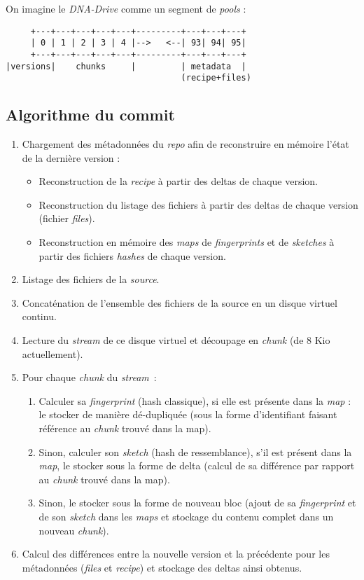 \documentclass[a4paper]{article}
\begin{document}
On imagine le \emph{DNA-Drive} comme un segment de \emph{pools} :

\begin{verbatim}
     +---+---+---+---+---+---------+---+---+---+
     | 0 | 1 | 2 | 3 | 4 |-->   <--| 93| 94| 95|
     +---+---+---+---+---+---------+---+---+---+
|versions|    chunks     |         | metadata  |
                                   (recipe+files)
\end{verbatim}

\subsection{Algorithme du commit}

\begin{enumerate}
\item
  Chargement des métadonnées du \emph{repo} afin de reconstruire en
  mémoire l'état de la dernière version :

  \begin{itemize}
  \item
    Reconstruction de la \emph{recipe} à partir des deltas de chaque
    version.
  \item
    Reconstruction du listage des fichiers à partir des deltas de chaque
    version (fichier \emph{files}).
  \item
    Reconstruction en mémoire des \emph{maps} de \emph{fingerprints} et
    de \emph{sketches} à partir des fichiers \emph{hashes} de chaque
    version.
  \end{itemize}
\item
  Listage des fichiers de la \emph{source}.
\item
  Concaténation de l'ensemble des fichiers de la source en un disque
  virtuel continu.
\item
  Lecture du \emph{stream} de ce disque virtuel et découpage en
  \emph{chunk} (de 8 Kio actuellement).
\item
  Pour chaque \emph{chunk} du \emph{stream}~:

  \begin{enumerate}
  \item
    Calculer sa \emph{fingerprint} (hash classique), si elle est
    présente dans la \emph{map} : le stocker de manière dé-dupliquée
    (sous la forme d'identifiant faisant référence au \emph{chunk}
    trouvé dans la map).
  \item
    Sinon, calculer son \emph{sketch} (hash de ressemblance), s'il est
    présent dans la \emph{map}, le stocker sous la forme de delta
    (calcul de sa différence par rapport au \emph{chunk} trouvé dans la
    map).
  \item
    Sinon, le stocker sous la forme de nouveau bloc (ajout de sa
    \emph{fingerprint} et de son \emph{sketch} dans les \emph{maps} et
    stockage du contenu complet dans un nouveau \emph{chunk}).
  \end{enumerate}
\item
  Calcul des différences entre la nouvelle version et la précédente pour
  les métadonnées (\emph{files} et \emph{recipe}) et stockage des deltas
  ainsi obtenus.
\end{enumerate}
\end{document}
